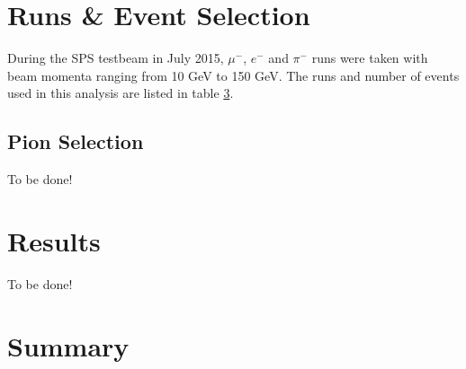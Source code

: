 \documentclass[twoside,a4paper,11pt]{article}
\begin{document}
\section{Runs \& Event Selection}
 
During the SPS testbeam in July 2015, $\mu^-$, $e^-$ and $\pi^-$ runs were taken with beam momenta ranging from 10 GeV to 150 GeV. 
The runs and number of events used in this analysis are listed in table \ref{}.

\subsection{Pion Selection}

To be done!

\section{Results}

To be done!

\section{Summary}

\clearpage
\end{document}
